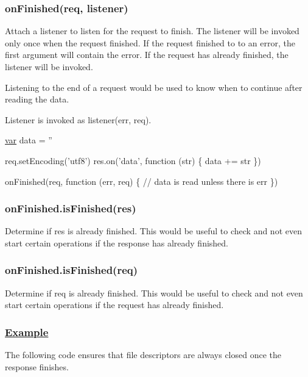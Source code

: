 \subsubsection*{on\+Finished(req, listener)}

Attach a listener to listen for the request to finish. The listener will be invoked only once when the request finished. If the request finished to to an error, the first argument will contain the error. If the request has already finished, the listener will be invoked.

Listening to the end of a request would be used to know when to continue after reading the data.

Listener is invoked as {\ttfamily listener(err, req)}.


\begin{DoxyCode}
\hyperlink{018__def_8c_a335628f2e9085305224b4f9cc6e95ed5}{var} data = \textcolor{stringliteral}{''}

req.setEncoding(\textcolor{stringliteral}{'utf8'})
res.on(\textcolor{stringliteral}{'data'}, \textcolor{keyword}{function} (str) \{
  data += str
\})

onFinished(req, \textcolor{keyword}{function} (err, req) \{
  \textcolor{comment}{// data is read unless there is err}
\})
\end{DoxyCode}


\subsubsection*{on\+Finished.\+is\+Finished(res)}

Determine if {\ttfamily res} is already finished. This would be useful to check and not even start certain operations if the response has already finished.

\subsubsection*{on\+Finished.\+is\+Finished(req)}

Determine if {\ttfamily req} is already finished. This would be useful to check and not even start certain operations if the request has already finished.

\subsubsection*{\hyperlink{struct_example}{Example}}

The following code ensures that file descriptors are always closed once the response finishes.


